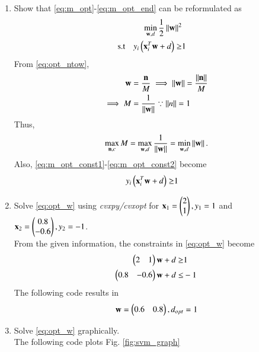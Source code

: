 \documentclass[journal,12pt,twocolumn]{IEEEtran}
\renewcommand\thesection{\arabic{section}}
\begin{document}
\begin{enumerate}[label=\thesection.\arabic*,ref=\thesection.\theenumi]
\item Show that \eqref{eq:m_opt}-\eqref{eq:m_opt_end} can be reformulated as
%
\begin{align}
\label{eq:opt_w}
\min_{\mathbf{w},d}\frac{1}{2}\left\Vert\mathbf{w}\right\Vert^2
\\
\text{s.t} \quad  y_i\left(\mathbf{x}_i^T\mathbf{w}+d\right) \ge&1
\end{align}
\solution From \eqref{eq:opt_ntow},
\begin{align}
\mathbf{w} &= \frac{\mathbf{n}}{M} \implies 
 \left\Vert\mathbf{w}\right\Vert = \frac{\left\Vert\mathbf{n}\right\Vert}{M} 
\\
\implies M &= \frac{1}{\left\Vert\mathbf{w}\right\Vert} \because \left\Vert n\right\Vert = 1
\end{align}
Thus, 
\begin{align}
\max_{\mathbf{n},c}M = \max_{\mathbf{w},d}\frac{1}{\left\Vert\mathbf{w}\right\Vert}=\min_{\mathbf{w},d}\left\Vert\mathbf{w}\right\Vert.
\end{align}
Also, \eqref{eq:m_opt_const1}-\eqref{eq:m_opt_const2} become
\begin{align}
y_i\left(\mathbf{x}_i^T\mathbf{w}+d\right) \ge&1
\end{align}
%
\item Solve \eqref{eq:opt_w} using {\em cvxpy/cvxopt} for $\mathbf{x}_1=\begin{pmatrix}2 \\ 1\end{pmatrix},y_1=1$ and 
$\mathbf{x}_2=\begin{pmatrix}0.8 \\ -0.6\end{pmatrix},y_2=-1$.
\\
\solution  From the given information, the constraints in \eqref{eq:opt_w} become
\begin{align}
\begin{pmatrix}2 & 1\end{pmatrix}\mathbf{w}+d \ge&1
\\
\begin{pmatrix}0.8 & -0.6\end{pmatrix}\mathbf{w}+d \le&-1
\end{align}
%
The following code results in 
\begin{align}
\mathbf{w} = \begin{pmatrix}0.6 & 0.8\end{pmatrix}, d_{opt} = 1
\end{align}

\item Solve \eqref{eq:opt_w} 
 graphically.
\\
\solution The following code plots Fig. \ref{fig:svm_graph}



\end{enumerate}
\end{document}
